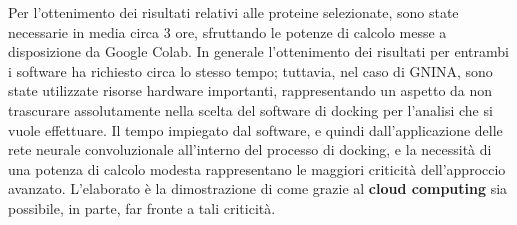 Per l'ottenimento dei risultati relativi alle proteine selezionate, sono state necessarie in media circa 3 ore, sfruttando le potenze di calcolo messe a disposizione da Google Colab. 
In generale l'ottenimento dei risultati per entrambi i software ha richiesto circa lo stesso tempo; tuttavia, nel caso di GNINA, sono state utilizzate risorse hardware importanti, rappresentando un aspetto da non trascurare assolutamente nella scelta del software di docking per l'analisi che si vuole effettuare. Il tempo impiegato dal software, e quindi dall'applicazione delle rete neurale convoluzionale all'interno del processo di docking, e la necessità di una potenza di calcolo modesta rappresentano le maggiori criticità dell'approccio avanzato. L'elaborato è la dimostrazione di come grazie al 
\textbf{cloud computing} sia possibile, in parte, far fronte a tali criticità.

